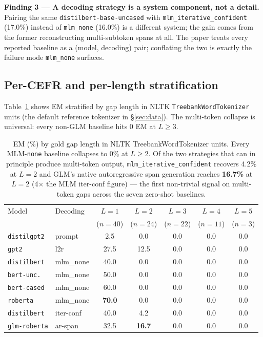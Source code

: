 \documentclass[11pt]{article}
\begin{document}
\textbf{Finding 3 — A decoding strategy is a system component, not a
detail.}
Pairing the same \texttt{distilbert-base-uncased} with
\texttt{mlm\_iterative\_confident} (17.0\%) instead of \texttt{mlm\_none}
(16.0\%) is a different system; the gain comes from the former
reconstructing multi-subtoken spans at all. The paper treats every
reported baseline as a (model, decoding) pair; conflating the two is
exactly the failure mode \texttt{mlm\_none} surfaces.

\subsection{Per-CEFR and per-length stratification}

Table~\ref{tab:diagnosis-length} shows EM stratified by gap length in
NLTK \texttt{TreebankWordTokenizer} units (the default reference
tokenizer in \S\ref{sec:data}). The multi-token collapse is universal:
every non-GLM baseline hits 0 EM at $L\geq 3$.

\begin{table}[t]
\centering\footnotesize
\setlength{\tabcolsep}{5pt}
\begin{tabular}{@{}llccccc@{}}
\toprule
Model & Decoding & $L{=}1$ & $L{=}2$ & $L{=}3$ & $L{=}4$ & $L{=}5$ \\
      &          & ($n{=}40$) & ($n{=}24$) & ($n{=}22$) & ($n{=}11$) & ($n{=}3$) \\
\midrule
\texttt{distilgpt2}  & prompt      &  2.5 &  0.0 & 0.0 & 0.0 & 0.0 \\
\texttt{gpt2}        & l2r         & 27.5 & 12.5 & 0.0 & 0.0 & 0.0 \\
\texttt{distilbert}  & mlm\_none        & 40.0 &  0.0 & 0.0 & 0.0 & 0.0 \\
\texttt{bert-unc.}   & mlm\_none        & 50.0 &  0.0 & 0.0 & 0.0 & 0.0 \\
\texttt{bert-cased}  & mlm\_none        & 60.0 &  0.0 & 0.0 & 0.0 & 0.0 \\
\texttt{roberta}     & mlm\_none        & \textbf{70.0} &  0.0 & 0.0 & 0.0 & 0.0 \\
\texttt{distilbert}  & iter-conf   & 40.0 &  4.2 & 0.0 & 0.0 & 0.0 \\
\texttt{glm-roberta} & ar-span     & 32.5 & \textbf{16.7} & 0.0 & 0.0 & 0.0 \\
\bottomrule
\end{tabular}
\caption{EM (\%) by gold gap length in NLTK TreebankWordTokenizer units.
Every MLM-\texttt{none} baseline collapses to 0\% at $L{\geq}2$. Of the
two strategies that can in principle produce multi-token output,
\texttt{mlm\_iterative\_confident} recovers 4.2\% at $L{=}2$ and GLM's
native autoregressive span generation reaches \textbf{16.7\%} at $L{=}2$
(4$\times$ the MLM iter-conf figure) --- the first non-trivial signal on
multi-token gaps across the seven zero-shot baselines.}
\label{tab:diagnosis-length}
\end{table}
\end{document}
